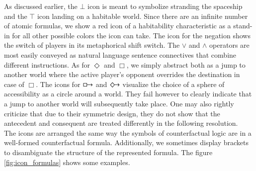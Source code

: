 \documentclass[a4paper,american,10pt]{paper}
\theoremstyle{definition}\newtheorem{definition}{Definition}
\begin{document}
As discussed earlier, the $\bot$ icon is meant to symbolize stranding the spaceship and the $\top$ icon landing on a habitable world. Since there are an infinite number of atomic formulas, we show a red icon of a habitability characteristic as a stand-in for all other possible colors the icon can take. The icon for the negation shows the switch of players in its metaphorical shift switch. The $\vee$ and $\wedge$ operators are most easily conveyed as natural language sentence connectives that combine different instructions. As for $\Diamond$ and $\Box$, we simply abstract both as a jump to another world where the active player's opponent overrides the destination in case of $\Box$. The icons for $\boxright$ and $\Diamondright$ visualize the choice of a sphere of accessibility as a circle around a world. They fail however to clearly indicate that a jump to another world will subsequently take place. One may also rightly criticize that due to their symmetric design, they do not show that the antecedent and consequent are treated differently in the following resolution.\\
\indent The icons are arranged the same way the symbols of counterfactual logic are in a well-formed counterfactual formula. Additionally, we sometimes display brackets to disambiguate the structure of the represented formula. The figure \ref{fig:icon_formulas} shows some examples.
\end{document}
